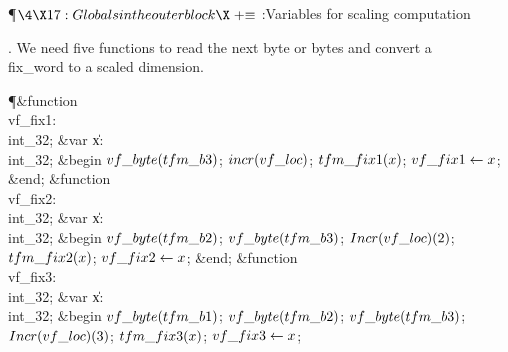 \Y\P$\4\X17:Globals in the outer block\X\mathrel{+}\S$\6
:Variables for scaling computation\X\par
\fi

. We need five functions to read the next byte or bytes and convert a
\\{fix\_word} to a scaled dimension.

\Y\P\4\&{function}\1\  \\{vf\_fix1}: \\{int\_32};\6
\4\&{var} \|x: \\{int\_32};\2\6
\&{begin} $\\{vf\_byte}(\\{tfm\_b3})$;\5
$\\{incr}(\\{vf\_loc})$;\5
$\\{tfm\_fix1}(\|x)$;\5
$\\{vf\_fix1}\K\|x$;\6
\&{end};\7
\4\&{function}\1\  \\{vf\_fix2}: \\{int\_32};\6
\4\&{var} \|x: \\{int\_32};\2\6
\&{begin} $\\{vf\_byte}(\\{tfm\_b2})$;\5
$\\{vf\_byte}(\\{tfm\_b3})$;\5
$\\{Incr}(\\{vf\_loc})(2)$;\5
$\\{tfm\_fix2}(\|x)$;\5
$\\{vf\_fix2}\K\|x$;\6
\&{end};\7
\4\&{function}\1\  \\{vf\_fix3}: \\{int\_32};\6
\4\&{var} \|x: \\{int\_32};\2\6
\&{begin} $\\{vf\_byte}(\\{tfm\_b1})$;\5
$\\{vf\_byte}(\\{tfm\_b2})$;\5
$\\{vf\_byte}(\\{tfm\_b3})$;\5
$\\{Incr}(\\{vf\_loc})(3)$;\6
$\\{tfm\_fix3}(\|x)$;\5
$\\{vf\_fix3}\K\|x$;\6

